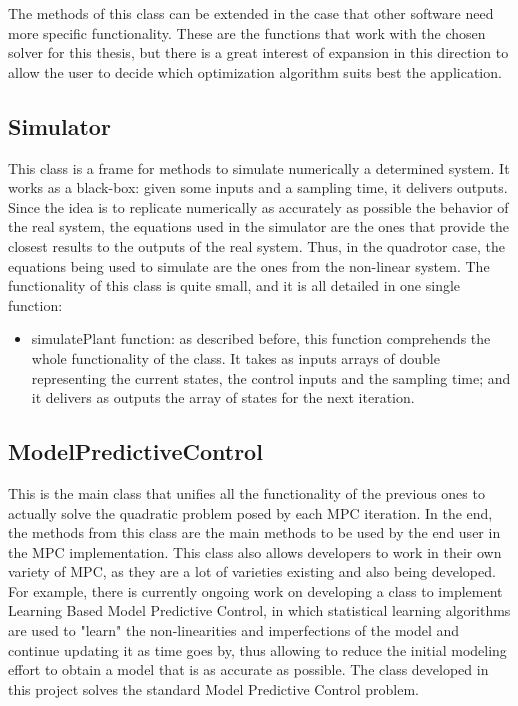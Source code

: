 The methods of this class can be extended in the case that other software need more specific functionality. These are the functions that work with the chosen solver for this thesis, but there is a great interest of expansion in this direction to allow the user to decide which optimization algorithm suits best the application.

\subsection{Simulator}

This class is a frame for methods to simulate numerically a determined system. It works as a black-box: given some inputs and a sampling time, it delivers outputs. Since the idea is to replicate numerically as accurately as possible the behavior of the real system, the equations used in the simulator are the ones that provide the closest results to the outputs of the real system. Thus, in the quadrotor case, the equations being used to simulate are the ones from the non-linear system. The functionality of this class is quite small, and it is all detailed in one single function:

\begin{itemize}

\item simulatePlant function: as described before, this function comprehends the whole functionality of the class. It takes as inputs arrays of double representing the current states, the control inputs and the sampling time; and it delivers as outputs the array of states for the next iteration. 

\end{itemize}

\subsection{ModelPredictiveControl}

This is the main class that unifies all the functionality of the previous ones to actually solve the quadratic problem posed by each MPC iteration. In the end, the methods from this class are the main methods to be used by the end user in the MPC implementation. This class also allows developers to work in their own variety of MPC, as they are a lot of varieties existing and also being developed. For example, there is currently ongoing work on developing a class to implement Learning Based Model Predictive Control, in which statistical learning algorithms are used to "learn" the non-linearities and imperfections of the model and continue updating it as time goes by, thus allowing to reduce the initial modeling effort to obtain a model that is as accurate as possible. The class developed in this project solves the standard Model Predictive Control problem. \\

